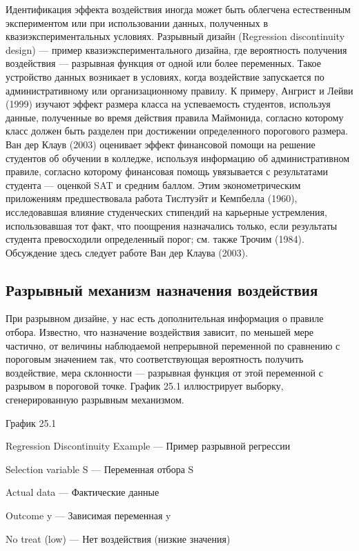Идентификация эффекта воздействия иногда может быть облегчена естественным экспериментом или при использовании данных, полученных в квазиэкспериментальных условиях. Разрывный дизайн (Regression discontinuity design) --- пример квазиэкспериментального дизайна, где вероятность получения воздействия --- разрывная функция от одной или более переменных. Такое устройство данных возникает в условиях, когда воздействие запускается по административному или организационному правилу. К примеру, Ангрист и Лейви (1999) изучают эффект размера класса на успеваемость студентов, используя данные, полученные во время действия правила Маймонида, согласно которому класс должен быть разделен при достижении определенного порогового размера. Ван дер Клаув (2003) оценивает эффект финансовой помощи на решение студентов об обучении в колледже, используя информацию об административном правиле, согласно которому финансовая помощь увязывается с результатами студента --- оценкой SAT и средним баллом. Этим эконометрическим приложениям предшествовала работа Тислтуэйт и Кемпбелла (1960), исследовавшая влияние студенческих стипендий на карьерные устремления, использовавшая тот факт, что поощрения назначались только, если результаты студента превосходили определенный порог; см. также Трочим (1984). Обсуждение здесь следует  работе Ван дер Клаува (2003).

\subsection{Разрывный механизм назначения воздействия}

При разрывном дизайне, у нас есть дополнительная информация о правиле отбора. Известно, что назначение воздействия зависит, по меньшей мере частично, от величины наблюдаемой непрерывной переменной по сравнению с пороговым значением так, что соответствующая вероятность получить воздействие, мера склонности --- разрывная функция от этой переменной с разрывом в пороговой точке. График 25.1 иллюстрирует выборку, сгенерированную разрывным механизмом. 

\vspace{3cm}
График 25.1

Regression Discontinuity Example --- Пример разрывной регрессии

Selection variable S --- Переменная отбора S

Actual data --- Фактические данные

Outcome y --- Зависимая переменная y

No treat (low) --- Нет воздействия (низкие значения)

